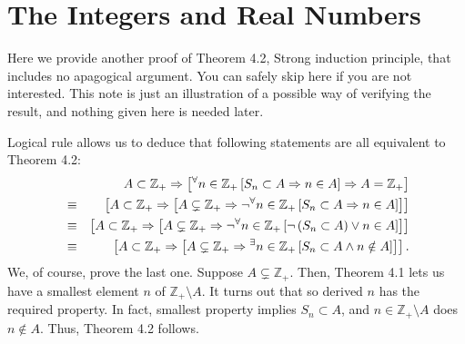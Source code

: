 \documentclass[a4paper,12pt]{article}
\begin{document}
\section{The Integers and Real Numbers}
\setcounter{exe}{0}
\begin{rem}
	Here we provide another proof of Theorem 4.2, Strong induction principle, 
	that includes no apagogical argument.
	You can safely skip here if you are not interested.
	This note is just an illustration of a possible way of verifying the result,
	and nothing given here is needed later.
	
	Logical rule allows us to deduce that following statements are all equivalent to Theorem 4.2:
	\begin{eqnarray*}
		&&
		A\subset \mathbb{Z}_{+}
		\Rightarrow
		\left[
			{}^{\forall}  n \in \mathbb{Z}_{+}
			\left[
				S_n \subset A \Rightarrow n\in A
				\right]
			\Rightarrow
			A=\mathbb{Z}_{+}
			\right]\\
		&\equiv&
		\left[
			A\subset \mathbb{Z}_{+}
			\Rightarrow 
			\left[
				A \subsetneq \mathbb{Z}_{+}
				\Rightarrow
				\neg
				{}^{\forall}  n \in \mathbb{Z}_{+}
				\left[
					S_n \subset A \Rightarrow n\in A
					\right]
				\right]
			\right]\\
		&\equiv&
		\left[
			A\subset \mathbb{Z}_{+}
			\Rightarrow
			\left[
				A \subsetneq \mathbb{Z}_{+}
				\Rightarrow
				\neg {}^{\forall}  n \in \mathbb{Z}_{+}
				\left[
					\neg \left( S_n \subset A \right)  \vee n\in A
					\right]
				\right]
			\right]\\
		&\equiv&
		\left[
			A\subset \mathbb{Z}_{+}
			\Rightarrow
			\left[
				A \subsetneq \mathbb{Z}_{+}
				\Rightarrow
				{}^{\exists} n \in \mathbb{Z}_{+}
				\left[
					S_n \subset A \wedge n\notin A
					\right]
				\right]
			\right].
	\end{eqnarray*}
	We, of course, prove the last one.
	Suppose
	\( A \subsetneq \mathbb{Z}_{+} \).
	Then, Theorem 4.1 lets us have a smallest element
	\( n \) of
	\( \mathbb{Z}_{+} \setminus A \).
	It turns out that so derived \( n \) has the required property.
	In fact, smallest property implies 
	\( S_n \subset A \),
	and
	\( n \in \mathbb{Z}_{+} \setminus A \)
	does
	\( n\notin A \).
	Thus, Theorem 4.2 follows.
\end{rem}
\end{document}
